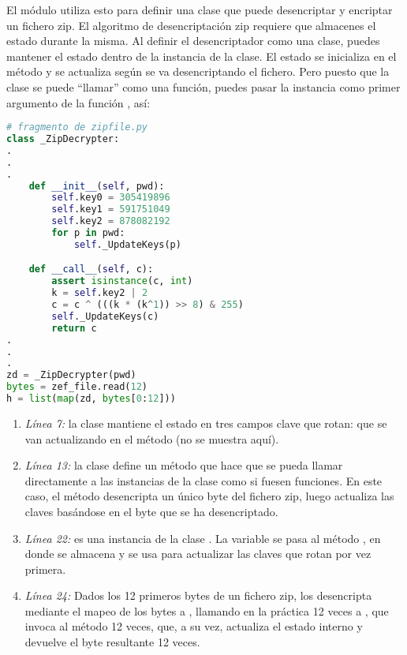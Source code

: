 El módulo \href{http://docs.python.org/3.1/library/zipfile.html}{} utiliza esto para definir una clase que puede desencriptar y encriptar un fichero zip. El algoritmo de desencriptación zip requiere que almacenes el estado durante la misma. Al definir el desencriptador como una clase, puedes mantener el estado dentro de la instancia de la clase. El estado se inicializa en el método  y se actualiza según se va desencriptando el fichero. Pero puesto que la clase se puede ``llamar'' como una función, puedes pasar la instancia como primer argumento de la función , así:


\begin{lstlisting}[language=Python,breaklines=true,mathescape=false]
# fragmento de zipfile.py
class _ZipDecrypter:
.
.
.
    def __init__(self, pwd):
        self.key0 = 305419896             
        self.key1 = 591751049
        self.key2 = 878082192
        for p in pwd:
            self._UpdateKeys(p)

    def __call__(self, c):      
        assert isinstance(c, int)
        k = self.key2 | 2
        c = c ^ (((k * (k^1)) >> 8) & 255)
        self._UpdateKeys(c)
        return c
.
.
.
zd = _ZipDecrypter(pwd)        
bytes = zef_file.read(12)
h = list(map(zd, bytes[0:12]))
\end{lstlisting}


\begin{enumerate}
  \item \emph{Línea 7:} la clase  mantiene el estado en tres campos clave que rotan: que se van actualizando en el método  (no se muestra aquí).
  \item \emph{Línea 13:} la clase define un método  que hace que se pueda llamar directamente a las instancias de la clase como si fuesen funciones. En este caso, el método  desencripta un único byte del fichero zip, luego actualiza las claves basándose en el byte que se ha desencriptado.
  \item \emph{Línea 22:}  es una instancia de la clase . La variable  se pasa al método , en donde se almacena y se usa para actualizar las claves que rotan por vez primera.
  \item \emph{Línea 24:} Dados los 12 primeros bytes de un fichero zip, los desencripta mediante el mapeo de los bytes a , llamando en la práctica 12 veces a , que invoca al método  12 veces, que, a su vez, actualiza el estado interno y devuelve el byte resultante 12 veces.
\end{enumerate}


